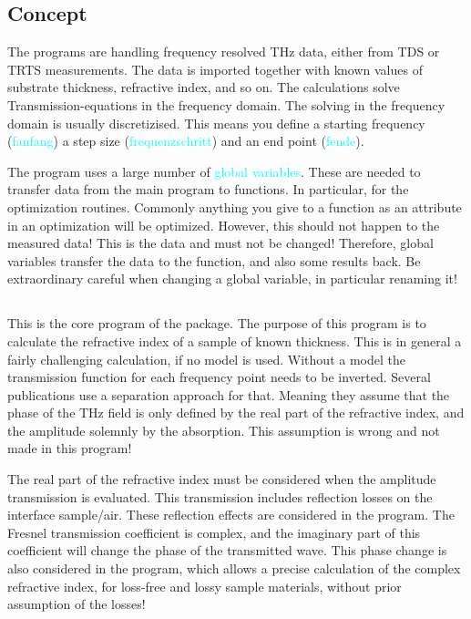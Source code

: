 \documentclass[12pt]{article}
\begin{document}
\subsection{Concept}
The programs are handling frequency resolved THz data, either from TDS or TRTS measurements. The data is imported together with known values of substrate thickness, refractive index, and so on. 
The calculations solve Transmission-equations in the frequency domain. 
The solving in the frequency domain is usually discretizised. This means you define a starting frequency  (\textcolor{cyan}{fanfang}) a step size (\textcolor{cyan}{frequenzschritt}) and an end point (\textcolor{cyan}{fende}). 

The program uses a large number of \textcolor{cyan}{global variables}. These are needed to transfer data from the main program to functions. In particular, for the optimization routines. Commonly anything you give to a function as an attribute in an optimization will be optimized. However, this should not happen to the measured data! This is the data and must not be changed! Therefore, global variables transfer the data to the function, and also some results back. 
Be extraordinary careful when changing a global variable, in particular renaming it! 

\subsection{\TDS}

This is the core program of the package. The purpose of this program is to calculate the refractive index of a sample of known thickness. This is in general a fairly challenging calculation, if no model is used. Without a model the transmission function for each frequency point needs to be inverted. Several publications use a separation approach for that. Meaning they assume that the phase of the THz field is only defined by the real part of the refractive index, and the amplitude solemnly by the absorption. This assumption is wrong and not made in this program! 

The real part of the refractive index must be considered when the amplitude transmission is evaluated. This transmission includes reflection losses on the interface sample/air. These reflection effects are considered in the program. The Fresnel transmission coefficient is complex, and the imaginary part of this coefficient will change the phase of the transmitted wave. This phase change is also considered in the program, which allows a precise calculation of the complex refractive index, for loss-free and lossy sample materials, without prior assumption of the losses! 
\end{document}
